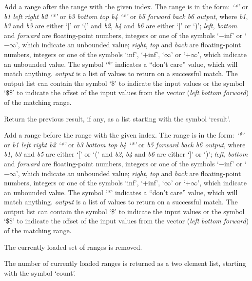   Add a range after the range with the given index.
  The range is in the form: \emph{`*'} or \emph{b1 left right b2} \emph{`*'} or \emph{b3 bottom top b4} \emph{`*'} or \emph{b5 forward back b6 output}, where
  \emph{b1}, \emph{b3} and \emph{b5} are either `[' or `(' and \emph{b2}, \emph{b4} and \emph{b6} are
  either `]' or `)';
  \emph{left}, \emph{bottom} and \emph{forward} are floating-point numbers, integers or one of the symbols `$-$inf' or
  `$-\infty$', which indicate an unbounded value;
  \emph{right}, \emph{top} and \emph{back} are floating-point numbers, integers or one of the symbols `inf', `$+$inf',
  `$\infty$' or `$+\infty$', which indicate an unbounded value.
  The symbol `*' indicates a ``don't care'' value, which will match anything.
  \emph{output} is a list of values to return on a successful match.
  The output list can contain the symbol `\$' to indicate the input values or the symbol `\$\$' to
  indicate the offset of the input values from the vector (\emph{left} \emph{bottom} \emph{forward}) of the
  matching range.

  Return the previous result, if any, as a list starting with the symbol `result'.

  Add a range before the range with the given index.
  The range is in the form: \emph{`*'} or \emph{b1 left right b2} \emph{`*'} or \emph{b3 bottom top b4} \emph{`*'} or \emph{b5 forward back b6 output}, where
  \emph{b1}, \emph{b3} and \emph{b5} are either `[' or `(' and \emph{b2}, \emph{b4} and \emph{b6} are
  either `]' or `)';
  \emph{left}, \emph{bottom} and \emph{forward} are floating-point numbers, integers or one of the symbols `$-$inf' or
  `$-\infty$', which indicate an unbounded value;
  \emph{right}, \emph{top} and \emph{back} are floating-point numbers, integers or one of the symbols `inf', `$+$inf',
  `$\infty$' or `$+\infty$', which indicate an unbounded value.
  The symbol `*' indicates a ``don't care'' value, which will match anything.
  \emph{output} is a list of values to return on a successful match.
  The output list can contain the symbol `\$' to indicate the input values or the symbol `\$\$' to
  indicate the offset of the input values from the vector (\emph{left} \emph{bottom} \emph{forward}) of the
  matching range.

  The currently loaded set of ranges is removed.
  
  The number of currently loaded ranges is returned as a two element list, starting with the symbol
  `count'.
  
